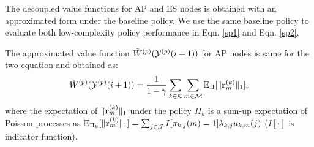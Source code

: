 The decoupled value functions for AP and ES nodes is obtained with an approximated form under the baseline policy. We use the same baseline policy to evaluate both low-complexity policy performance in Eqn. \ref{sp1} and Eqn. \ref{sp2}.
        
The approximated value function $\tilde{W}^{(p)}(\mathcal{Y}^{(p)}(i+1))$ for AP nodes is same for the two equation and obtained as:
\begin{align}
    \tilde{W}^{(p)}(\mathcal{Y}^{(p)}(i+1)) = \frac{1}{1-\gamma}
        \sum_{k\in\mathcal{K}}\sum_{m\in\mathcal{M}} \mathbb{E}_{\Pi}[\lVert\mathbf{r}^{(k)}_{m}\|_1],
\end{align}
where the expectation of $\lVert\mathbf{r}^{(k)}_{m}\|_1$ under the policy $\Pi_k$ is a sum-up expectation of Poisson processes as $\mathbb{E}_{\Pi_k}[\lVert\mathbf{r}^{(k)}_{m}\|_1] = \sum_{j\in\mathcal{J}} I[\pi_{k,j}(m)=1] \lambda_{k,j} u_{k,m}(j)$ ($I[\cdot]$ is indicator function).
        

